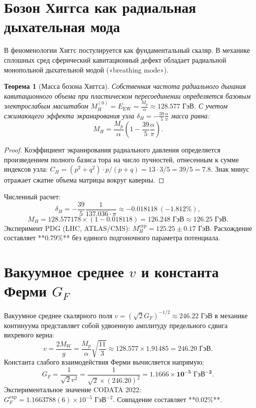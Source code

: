 \documentclass[11pt,a4paper]{article}
\newtheorem{theorem}{Теорема}
\theoremstyle{definition}
\theoremstyle{remark}
\begin{document}
\section{Бозон Хиггса как радиальная дыхательная мода}
В феноменологии Хиггс постулируется как фундаментальный скаляр. В механике сплошных сред сферический кавитационный дефект обладает радиальной монопольной дыхательной модой («breathing mode»).

\begin{theorem}[Масса бозона Хиггса]
Собственная частота радиального дыхания кавитационного объема при пластическом пересоединении определяется базовым электрослабым масштабом $M_H^{(0)} = E_{\mathrm{EW}} = \frac{M_p}{\alpha} \approx 128.577\text{ ГэВ}$.
С учетом сжимающего эффекта экранирования узла $\delta_H = -\frac{39}{5}\frac{\alpha}{\pi}$ масса равна:
\begin{equation}
    M_H = \frac{M_p}{\alpha} \left( 1 - \frac{39}{5}\frac{\alpha}{\pi} \right).
\end{equation}
\end{theorem}
\begin{proof}
Коэффициент экранирования радиального давления определяется произведением полного базиса тора на число пучностей, отнесенным к сумме индексов узла: $C_H = (p^2+q^2) \cdot p / (p+q) = 13 \cdot 3 / 5 = 39/5 = 7.8$. Знак минус отражает сжатие объема матрицы вокруг каверны.
\end{proof}

Численный расчет:
\begin{equation}
    \delta_H = -\frac{39}{5} \frac{1}{137.036 \cdot \pi} \approx -0.018118 \ (-1.812\%),
\end{equation}
\begin{equation}
    M_H = 128.577178 \times (1 - 0.018118) = \mathbf{126.248\text{ ГэВ}} \approx 126.25\text{ ГэВ}.
\end{equation}
Эксперимент PDG (LHC, ATLAS/CMS): $M_H^{\mathrm{exp}} = 125.25 \pm 0.17\text{ ГэВ}$. 
Расхождение составляет **$0.79\%$** без единого подгоночного параметра потенциала.

\section{Вакуумное среднее $v$ и константа Ферми $G_F$}
Вакуумное среднее скалярного поля $v = (\sqrt{2} G_F)^{-1/2} \approx 246.22\text{ ГэВ}$ в механике континуума представляет собой удвоенную амплитуду предельного сдвига вихревого керна:
\begin{equation}
    v = \frac{2 M_W}{g} = \frac{M_p}{\alpha} \sqrt{\frac{11}{3}} \approx 128.577 \times 1.91485 = \mathbf{246.20\text{ ГэВ}}.
\end{equation}
Константа слабого взаимодействия Ферми вычисляется напрямую:
\begin{equation}
    G_F = \frac{1}{\sqrt{2} v^2} = \frac{1}{\sqrt{2} \times (246.20)^2} = \mathbf{1.1666 \times 10^{-5}\text{ ГэВ}^{-2}}.
\end{equation}
Экспериментальное значение CODATA 2022: $G_F^{\mathrm{exp}} = 1.1663788(6) \times 10^{-5}\text{ ГэВ}^{-2}$. Совпадение составляет **$0.02\%$**.
\end{document}
